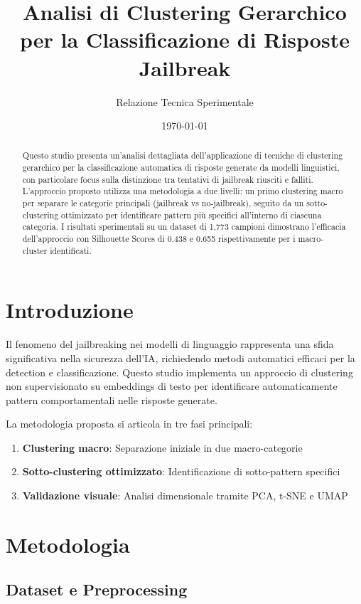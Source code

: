 \documentclass[12pt,a4paper]{article}
\title{\textbf{Analisi di Clustering Gerarchico per la Classificazione di Risposte Jailbreak}}
\author{Relazione Tecnica Sperimentale}
\date{\today}
\begin{document}
\maketitle

\begin{abstract}
Questo studio presenta un'analisi dettagliata dell'applicazione di tecniche di clustering gerarchico per la classificazione automatica di risposte generate da modelli linguistici, con particolare focus sulla distinzione tra tentativi di jailbreak riusciti e falliti. L'approccio proposto utilizza una metodologia a due livelli: un primo clustering macro per separare le categorie principali (jailbreak vs no-jailbreak), seguito da un sotto-clustering ottimizzato per identificare pattern più specifici all'interno di ciascuna categoria. I risultati sperimentali su un dataset di 1,773 campioni dimostrano l'efficacia dell'approccio con Silhouette Scores di 0.438 e 0.655 rispettivamente per i macro-cluster identificati.
\end{abstract}

\section{Introduzione}

Il fenomeno del jailbreaking nei modelli di linguaggio rappresenta una sfida significativa nella sicurezza dell'IA, richiedendo metodi automatici efficaci per la detection e classificazione. Questo studio implementa un approccio di clustering non supervisionato su embeddings di testo per identificare automaticamente pattern comportamentali nelle risposte generate.

La metodologia proposta si articola in tre fasi principali:
\begin{enumerate}
    \item \textbf{Clustering macro}: Separazione iniziale in due macro-categorie
    \item \textbf{Sotto-clustering ottimizzato}: Identificazione di sotto-pattern specifici  
    \item \textbf{Validazione visuale}: Analisi dimensionale tramite PCA, t-SNE e UMAP
\end{enumerate}

\section{Metodologia}

\subsection{Dataset e Preprocessing}
\end{document}
